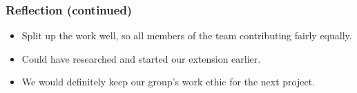 \documentclass{beamer}
\begin{document}
\begin{frame}
\frametitle{Reflection (continued)}
\begin{itemize}
	\item Split up the work well, so all members of the team contributing fairly equally.
	\item Could have researched and started our extension earlier.
	\item We would definitely keep our group's work ethic for the next project.
\end{itemize}
\end{frame}
\end{document}
